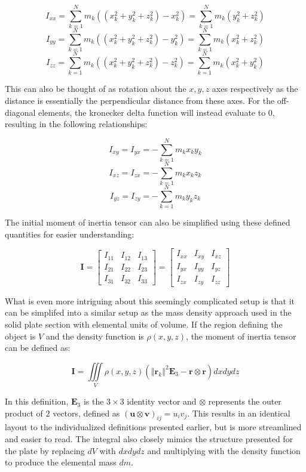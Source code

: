 \[I_{xx} = \sum_{k=1}^N m_k((x_k^2 + y_k^2 + z_k^2) - x_k^2) = \sum_{k=1}^N m_k(y_k^2 + z_k^2)\]
\[I_{yy} = \sum_{k=1}^N m_k((x_k^2 + y_k^2 + z_k^2) - y_k^2) = \sum_{k=1}^N m_k(x_k^2 + z_k^2)\]
\[I_{zz} = \sum_{k=1}^N m_k((x_k^2 + y_k^2 + z_k^2) - z_k^2) = \sum_{k=1}^N m_k(x_k^2 + y_k^2)\]

This can also be thought of as rotation about the $x, y, z$ axes respectively as the distance is essentially the perpendicular distance from these axes. For the off-diagonal elements, the kronecker delta function will instead evaluate to $0$, resulting in the following relationships:


\[I_{xy} = I_{yx} = -\sum_{k=1}^N m_kx_ky_k\]
\[I_{xz} = I_{zx} = -\sum_{k=1}^N m_kx_kz_k\]
\[I_{yz} = I_{zy} = -\sum_{k=1}^N m_ky_kz_k\]

The initial moment of inertia tensor can also be simplified using these defined quantities for easier understanding:

\[\bm{I} = \begin{bmatrix}I_{11} & I_{12} & I_{13} \\ I_{21} & I_{22} & I_{23} \\ I_{31} & I_{32} & I_{33}\end{bmatrix} = \begin{bmatrix}I_{xx} & I_{xy} & I_{xz} \\ I_{yx} & I_{yy} & I_{yz} \\ I_{zx} & I_{zy} & I_{zz}\end{bmatrix}\]

What is even more intriguing about this seemingly complicated setup is that it can be simplifed into a similar setup as the mass density approach used in the solid plate section with elemental units of volume. If the region defining the object is $V$ and the density function is $\rho(x,y,z)$, the moment of inertia tensor can be defined as:

\begin{equation}
\bm{I} = \iiint\limits_{V} \rho(x,y,z)(\left\Vert \bm{r}_k \right\Vert^2\bm{E}_3 - \bm{r} \otimes \bm{r})dxdydz
\label{eq:inertia_tensor_integral}
\end{equation}

In this definition, $\bm{E}_3$ is the $3 \times 3$ identity vector and $\otimes$ represents the outer product of $2$ vectors, defined as $(\bm{u} \otimes \bm{v})_{ij} = u_iv_j$. This results in an identical layout to the individualized definitions presented earlier, but is more streamlined and easier to read. The integral also closely mimics the structure presented for the plate by replacing $dV$ with $dxdydz$ and multiplying with the density function to produce the elemental mass $dm$.

